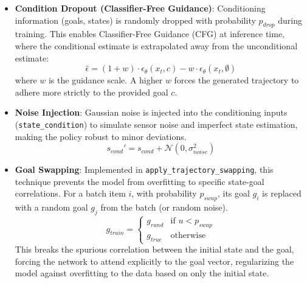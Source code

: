 \begin{itemize}
\item
  \textbf{Condition Dropout (Classifier-Free Guidance)}: Conditioning
  information (goals, states) is randomly dropped with probability
  \(p_{drop}\) during training. This enables Classifier-Free Guidance
  (CFG) at inference time, where the conditional estimate is
  extrapolated away from the unconditional estimate:
  \[ \hat{\epsilon} = (1 + w) \cdot \epsilon_\theta(x_t, c) - w \cdot \epsilon_\theta(x_t, \emptyset) \]
  where \(w\) is the guidance scale. A higher \(w\) forces the generated
  trajectory to adhere more strictly to the provided goal \(c\).
\item
  \textbf{Noise Injection}: Gaussian noise is injected into the
  conditioning inputs (\texttt{state\_condition}) to simulate sensor
  noise and imperfect state estimation, making the policy robust to
  minor deviations.
  \[ s_{cond}' = s_{cond} + \mathcal{N}(0, \sigma_{noise}^2) \]
\item
  \textbf{Goal Swapping}: Implemented in
  \texttt{apply\_trajectory\_swapping}, this technique prevents the
  model from overfitting to specific state-goal correlations. For a
  batch item \(i\), with probability \(p_{swap}\), its goal \(g_i\) is
  replaced with a random goal \(g_j\) from the batch (or random noise).
  \[ g_{train} = \begin{cases} g_{rand} & \text{if } u < p_{swap} \\ g_{true} & \text{otherwise} \end{cases} \]
  This breaks the spurious correlation between the initial state and the
  goal, forcing the network to attend explicitly to the goal vector, regularizing the model against overfitting to the data based on only the initial state.
\end{itemize}